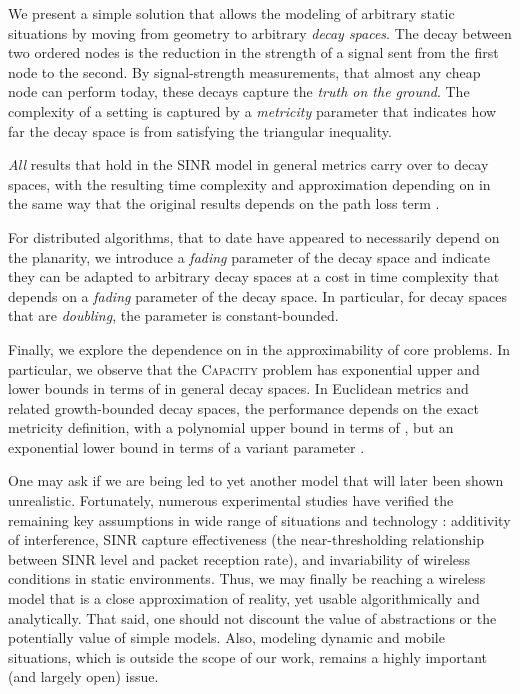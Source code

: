 \documentclass[11pt]{amsart}
\newcommand{\prob}[1]{\textsc{#1}}
\newcommand{\Capacity}{\prob{Capacity}}
\newcommand{\capacity}{\Capacity}
\begin{document}
We present a simple solution that allows the modeling of arbitrary static
situations by moving from geometry to arbitrary \emph{decay spaces}.
The decay between two ordered nodes is the reduction in the strength
of a signal sent from the first node to the second.
By signal-strength measurements, that almost any cheap node can
perform today, these decays capture the \emph{truth on the ground}.
The complexity of a setting is captured by a
\emph{metricity} parameter  that indicates how far the decay
space is from satisfying the triangular inequality.

\emph{All} results that hold in the SINR model in general metrics carry over
to decay spaces, with the resulting time complexity and approximation
depending on  in the same way that the original results depends
on the path loss term .


For distributed algorithms, that to date have appeared to necessarily depend on
the planarity, we introduce a \emph{fading} parameter of the decay space
and indicate they can be adapted to arbitrary decay spaces
at a cost in time complexity that depends on a \emph{fading} parameter
of the decay space. In particular, for decay spaces that are
\emph{doubling}, the parameter is constant-bounded.

Finally, we explore the dependence on  in the approximability
of core problems. In particular, we observe that the {\capacity} problem 
has exponential upper and lower bounds in terms of  in general
decay spaces. In Euclidean metrics and related growth-bounded decay
spaces, the performance depends on the exact metricity definition, 
with a polynomial upper bound in terms of , but an exponential
lower bound in terms of a variant parameter .

One may ask if we are being led to yet another model that will later been shown unrealistic. Fortunately, numerous experimental studies have verified the remaining key assumptions in wide range of situations and technology \cite{son2006,MaheshwariJD2008,chen2010,sevani2012sir,us:ICDCS14}: additivity of interference, SINR capture effectiveness (the near-thresholding relationship between SINR level and packet reception rate), and invariability of wireless conditions in static environments. Thus, we may finally be reaching a wireless model that is a close approximation of reality, yet usable algorithmically and analytically.
That said, one should not discount the value of abstractions or the potentially value of simple models. Also, modeling dynamic and mobile situations, which is outside the scope of our work, remains a highly important (and largely open) issue.
\end{document}
